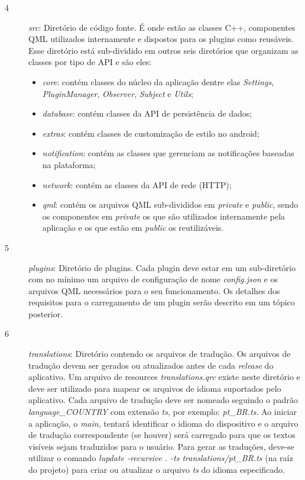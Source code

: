 \begin{description}
	\item[4] \textit{src}: Diretório de código fonte. É onde estão as classes C++, componentes QML utilizados internamente e dispostos para os plugins como reusáveis. Esse diretório está sub-dividido em outros seis diretórios que organizam as classes por tipo de API e são eles:

	\begin{itemize}
		\item \textit{core}: contém classes do núcleo da aplicação dentre elas \textit{Settings}, \textit{PluginManager}, \textit{Observer}, \textit{Subject} e \textit{Utils};

		\item \textit{database}: contém classes da API de persistência de dados;

		\item \textit{extras}: contém classes de customização de estilo no android;

		\item \textit{notification}: contém as classes que gerenciam as notificações baseadas na plataforma;

		\item \textit{network}: contém as classes da API de rede (HTTP);

		\item \textit{qml}: contém os arquivos QML sub-divididos em \textit{private} e \textit{public}, sendo os componentes em \textit{private} os que são utilizados internamente pela aplicação e os que estão em \textit{public} os reutilizáveis.
	\end{itemize}

	\item[5] \textit{plugins}: Diretório de plugins. Cada plugin deve estar em um sub-diretório com no mínimo um arquivo de configuração de nome \textit{config.json} e os arquivos QML necessários para o seu funcionamento. Os detalhes dos requisitos para o carregamento de um plugin serão descrito em um tópico posterior.

	\item[6] \textit{translations}: Diretório contendo os arquivos de tradução. Os arquivos de tradução devem ser gerados ou atualizados antes de cada \textit{release} do aplicativo. Um arquivo de resources \textit{translations.qrc} existe neste diretório e deve ser utilizado para mapear os arquivos de idioma suportados pelo aplicativo. Cada arquivo de tradução deve ser nomeado seguindo o padrão \textit{language\_COUNTRY} com extensão \textit{ts}, por exemplo: \textit{pt\_BR.ts}. Ao iniciar a aplicação, o \textit{main}, tentará identificar o idioma do dispositivo e o arquivo de tradução correspondente (se houver) será carregado para que os textos visíveis sejam traduzidos para o usuário. Para gerar as traduções, deve-se utilizar o comando \textit{lupdate -recursive . -ts translations/pt\_BR.ts} (na raíz do projeto) para criar ou atualizar o arquivo \textit{ts} do idioma especificado.


\end{description}
